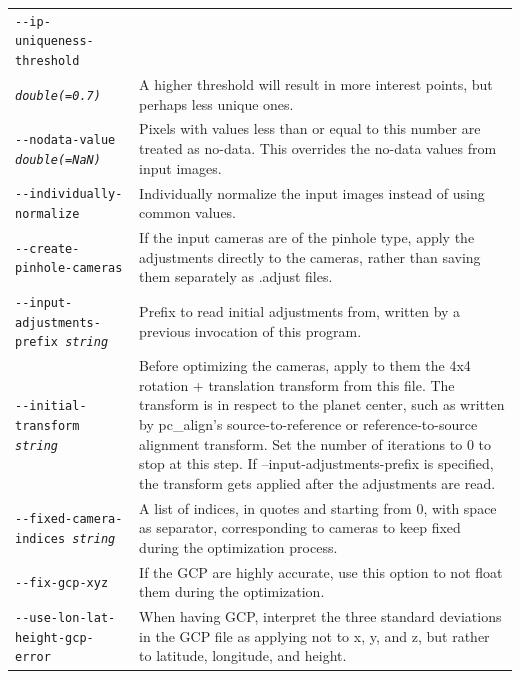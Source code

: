 \begin{longtable}{|p{8cm}|p{9cm}|}
\texttt{-\/-ip-uniqueness-threshold} \\
\texttt{\textit{double(=0.7)}} & 
A higher threshold will result in more interest points, but perhaps less unique ones.
\\ \hline

\texttt{-\/-nodata-value \textit{double(=NaN)}} & 
Pixels with values less than or equal to this number are treated as no-data. This overrides the no-data values from input images.
\\ \hline

\texttt{-\/-individually-normalize} & Individually normalize the input images instead of using common values.
\\ \hline

\texttt{-\/-create-pinhole-cameras} & If the input cameras are of the pinhole type, apply the adjustments directly to the cameras, rather than saving them separately as .adjust files. 
\\ \hline

\texttt{-\/-input-adjustments-prefix \textit{string}} & Prefix to read initial adjustments from, written by a previous invocation of this program. \\ \hline

\texttt{-\/-initial-transform \textit{string}} & Before optimizing the cameras, apply to them the 4x4 rotation + translation transform from this file. The transform is in respect to the planet center, such as written by pc\_align's source-to-reference or reference-to-source alignment transform. Set the number of iterations to 0 to stop at this step. If --input-adjustments-prefix is specified, the transform gets applied after the adjustments are read. \\ \hline

\texttt{-\/-fixed-camera-indices \textit{string}} & A list of indices, in quotes and starting from 0, with space as separator, corresponding to cameras to keep fixed during the optimization process.
\\ \hline

\texttt{-\/-fix-gcp-xyz} & If the GCP are highly accurate, use this option to not float them during the optimization.\\ \hline


\texttt{-\/-use-lon-lat-height-gcp-error} & When having GCP, interpret the three standard deviations in the GCP file as applying not to x, y, and z, but rather to latitude, longitude, and height.\\ \hline


\end{longtable}
